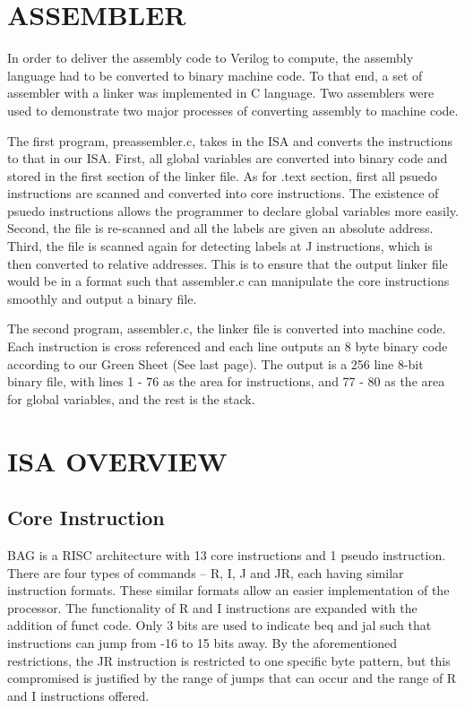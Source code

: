 \documentclass[11pt, titlepage]{article}
\begin{document}
\section{ASSEMBLER}
In order to deliver the assembly code to Verilog to compute, the assembly language had to be converted to binary machine code. To that end, a set of assembler with a linker was implemented in C language. Two assemblers were used to demonstrate two major processes of converting assembly to machine code.

\par The first program, preassembler.c, takes in the ISA and converts the instructions to that in our ISA. First, all global variables are converted into binary code and stored in the first section of the linker file. As for .text section, first all psuedo instructions are scanned and converted into core instructions. The existence of psuedo instructions allows the programmer to declare global variables more easily. Second, the file is re-scanned and all the labels are given an absolute address. Third, the file is scanned again for detecting labels at J instructions, which is then converted to relative addresses. This is to ensure that the output linker file would be in a format such that assembler.c can manipulate the core instructions smoothly and output a binary file.

\par The second program, assembler.c, the linker file is converted into machine code. Each instruction is cross referenced and each line outputs an 8 byte binary code according to our Green Sheet (See last page). The output is a 256 line 8-bit binary file, with lines 1 - 76 as the area for instructions, and 77 - 80 as the area for global variables, and the rest is the stack. 

\section{ISA OVERVIEW}
\subsection{Core Instruction}
BAG is a RISC architecture with 13 core instructions and 1 pseudo instruction. There are four types of commands -- R, I, J and JR, each having similar instruction formats. These similar formats allow an easier implementation of the processor. The functionality of R and I instructions are expanded with the addition of funct code. Only 3 bits are used to indicate beq and jal such that instructions can jump from -16 to 15 bits away. By the aforementioned restrictions, the JR instruction is restricted to one specific byte pattern, but this compromised is justified by the range of jumps that can occur and the range of R and I instructions offered.
\end{document}

